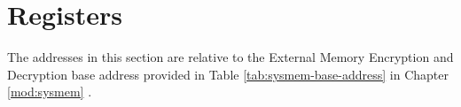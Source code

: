 \documentclass[main\_\_EN.tex]{subfiles}
\begin{document}


\clearpage
\section{Registers}

The addresses in this section are relative to the External Memory Encryption and Decryption base address provided in Table \ref{tab:sysmem-base-address} in Chapter \ref{mod:sysmem} \textit{}.


\end{document}
